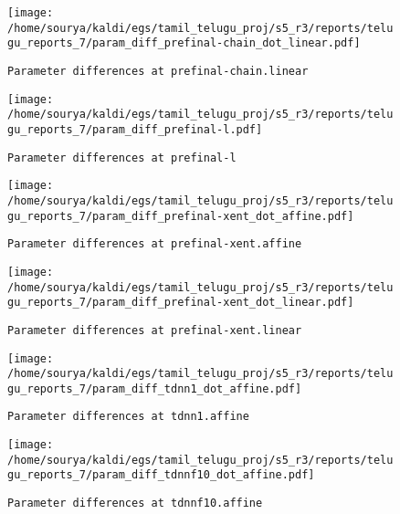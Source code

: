 \documentclass[prl,10pt,twocolumn]{revtex4}
\begin{document}
\newpage
\begin{figure}[h]
  \begin{center}
    \caption{\texttt{Parameter differences at prefinal-chain.linear}}
    \texttt{[image: /home/sourya/kaldi/egs/tamil\_telugu\_proj/s5\_r3/reports/telugu\_reports\_7/param\_diff\_prefinal-chain\_dot\_linear.pdf]}
  \end{center}
\end{figure}
\clearpage


\newpage
\begin{figure}[h]
  \begin{center}
    \caption{\texttt{Parameter differences at prefinal-l}}
    \texttt{[image: /home/sourya/kaldi/egs/tamil\_telugu\_proj/s5\_r3/reports/telugu\_reports\_7/param\_diff\_prefinal-l.pdf]}
  \end{center}
\end{figure}
\clearpage


\newpage
\begin{figure}[h]
  \begin{center}
    \caption{\texttt{Parameter differences at prefinal-xent.affine}}
    \texttt{[image: /home/sourya/kaldi/egs/tamil\_telugu\_proj/s5\_r3/reports/telugu\_reports\_7/param\_diff\_prefinal-xent\_dot\_affine.pdf]}
  \end{center}
\end{figure}
\clearpage


\newpage
\begin{figure}[h]
  \begin{center}
    \caption{\texttt{Parameter differences at prefinal-xent.linear}}
    \texttt{[image: /home/sourya/kaldi/egs/tamil\_telugu\_proj/s5\_r3/reports/telugu\_reports\_7/param\_diff\_prefinal-xent\_dot\_linear.pdf]}
  \end{center}
\end{figure}
\clearpage


\newpage
\begin{figure}[h]
  \begin{center}
    \caption{\texttt{Parameter differences at tdnn1.affine}}
    \texttt{[image: /home/sourya/kaldi/egs/tamil\_telugu\_proj/s5\_r3/reports/telugu\_reports\_7/param\_diff\_tdnn1\_dot\_affine.pdf]}
  \end{center}
\end{figure}
\clearpage


\newpage
\begin{figure}[h]
  \begin{center}
    \caption{\texttt{Parameter differences at tdnnf10.affine}}
    \texttt{[image: /home/sourya/kaldi/egs/tamil\_telugu\_proj/s5\_r3/reports/telugu\_reports\_7/param\_diff\_tdnnf10\_dot\_affine.pdf]}
  \end{center}
\end{figure}
\clearpage
\end{document}

